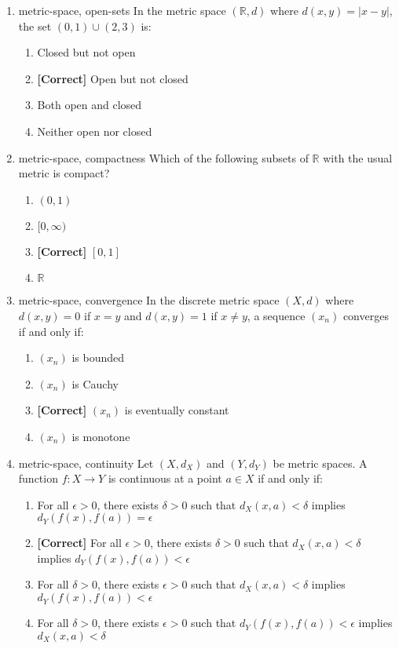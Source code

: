 \documentclass{article}
\newenvironment{problem}{\item}{}
\newcommand{\choice}{\item}
\newcommand{\correctchoice}{\item \textbf{[Correct] }}
\newcommand{\tags}[1]{#1} %
\begin{document}
\begin{enumerate}
        \begin{problem}
            \tags{metric-space, open-sets}
            In the metric space $(\mathbb{R}, d)$ where $d(x,y) = |x-y|$, the set $(0, 1) \cup (2, 3)$ is:
            \begin{enumerate}
                \choice Closed but not open
                \correctchoice Open but not closed
                \choice Both open and closed
                \choice Neither open nor closed
            \end{enumerate}
        \end{problem}
        
        \begin{problem}
            \tags{metric-space, compactness}
            Which of the following subsets of $\mathbb{R}$ with the usual metric is compact?
            \begin{enumerate}
                \choice $(0,1)$
                \choice $[0, \infty)$
                \correctchoice $[0,1]$
                \choice $\mathbb{R}$
            \end{enumerate}
        \end{problem}
        
        \begin{problem}
            \tags{metric-space, convergence}
            In the discrete metric space $(X, d)$ where $d(x,y) = 0$ if $x = y$ and $d(x,y) = 1$ if $x \neq y$, a sequence $(x_n)$ converges if and only if:
            \begin{enumerate}
                \choice $(x_n)$ is bounded
                \choice $(x_n)$ is Cauchy
                \correctchoice $(x_n)$ is eventually constant
                \choice $(x_n)$ is monotone
            \end{enumerate}
        \end{problem}
        
        \begin{problem}
            \tags{metric-space, continuity}
            Let $(X, d_X)$ and $(Y, d_Y)$ be metric spaces. A function $f: X \to Y$ is continuous at a point $a \in X$ if and only if:
            \begin{enumerate}
                \choice For all $\epsilon > 0$, there exists $\delta > 0$ such that $d_X(x, a) < \delta$ implies $d_Y(f(x), f(a)) = \epsilon$
                \correctchoice For all $\epsilon > 0$, there exists $\delta > 0$ such that $d_X(x, a) < \delta$ implies $d_Y(f(x), f(a)) < \epsilon$
                \choice For all $\delta > 0$, there exists $\epsilon > 0$ such that $d_X(x, a) < \delta$ implies $d_Y(f(x), f(a)) < \epsilon$
                \choice For all $\delta > 0$, there exists $\epsilon > 0$ such that $d_Y(f(x), f(a)) < \epsilon$ implies $d_X(x, a) < \delta$
            \end{enumerate}
        \end{problem}
        

\end{enumerate}
\end{document}
